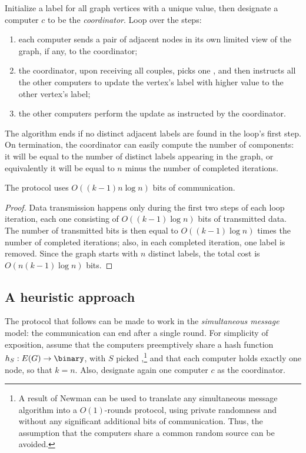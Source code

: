 Initialize a label for all graph vertices with a unique value, then designate a computer $c$ to be the \emph{coordinator}. Loop over the steps:
\begin{enumerate}
    \item each computer sends a pair of adjacent nodes in its own limited view of the graph, if any, to the coordinator;
    \item the coordinator, upon receiving all couples, picks one \uar{}, and then instructs all the other computers to update the vertex's label with higher value to the other vertex's label;
    \item the other computers perform the update as instructed by the coordinator.
\end{enumerate}
The algorithm ends if no distinct adjacent labels are found in the loop's first step. On termination, the coordinator can easily compute the number of components: it will be equal to the number of distinct labels appearing in the graph, or equivalently it will be equal to $n$ minus the number of completed iterations.

\begin{theorem}
    The protocol uses $O((k - 1) n \log n)$ bits of communication.
\end{theorem}
\begin{proof}
    Data transmission happens only during the first two steps of each loop iteration, each one consisting of $O((k - 1) \log n)$ bits of transmitted data. The number of transmitted bits is then equal to $O((k-1) \log n)$ times the number of completed iterations; also, in each completed iteration, one label is removed. Since the graph starts with $n$ distinct labels, the total cost is $O(n (k-1) \log n)$ bits.
\end{proof}


\subsection{A heuristic approach}


The protocol that follows can be made to work in the \emph{simultaneous message} model: the communication can end after a single round. For simplicity of exposition, assume that the computers preemptively share a hash function $h_S: E(G) \to \binary$, with $S$ picked \uar{},\footnote{A result of Newman can be used to translate any simultaneous message algorithm into a $O(1)$-rounds protocol, using private randomness and without any significant additional bits of communication. Thus, the assumption that the computers share a common random source can be avoided.} and that each computer holds exactly one node, so that $k = n$. Also, designate again one computer $c$ as the coordinator.

